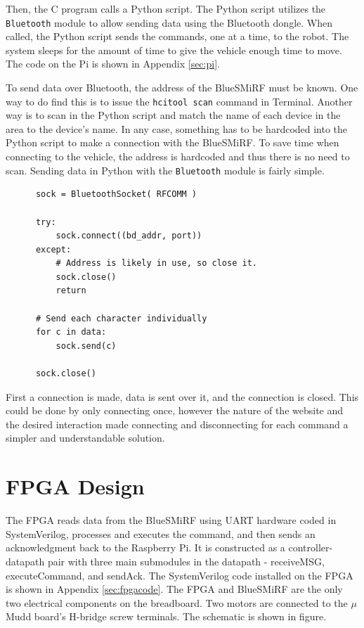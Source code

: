 \documentclass[12pt]{article}
\begin{document}
Then, the C program calls a Python script. The Python script utilizes the \verb.Bluetooth. module to allow sending data using the Bluetooth dongle. When called, the Python script sends the commands, one at a time, to the robot. The system sleeps for the amount of time to give the vehicle enough time to move. The code on the Pi is shown in Appendix \ref{sec:pi}. 

To send data over Bluetooth, the address of the BlueSMiRF must be known. One way to do find this is to issue the \verb.hcitool scan. command in Terminal. Another way is to scan in the Python script and match the name of each device in the area to the device's name. In any case, something has to be hardcoded into the Python script to make a connection with the BlueSMiRF. To save time when connecting to the vehicle, the address is hardcoded and thus there is no need to scan.
\newpage
Sending data in Python with the \verb.Bluetooth. module is fairly simple.

\begin{verbatim}
      sock = BluetoothSocket( RFCOMM )
  
      try:
          sock.connect((bd_addr, port))
      except:
          # Address is likely in use, so close it.
          sock.close()
          return
      
      # Send each character individually
      for c in data:
          sock.send(c)
      
      sock.close()
\end{verbatim}
First a connection is made, data is sent over it, and the connection is closed. This could be done by only connecting once, however the nature of the website and the desired interaction made connecting and disconnecting for each command a simpler and understandable solution.

\section{FPGA Design}

The FPGA reads data from the BlueSMiRF using UART hardware coded in SystemVerilog, processes and executes the command, and then sends an acknowledgment back to the Raspberry Pi.  It is constructed as a controller-datapath pair with three main submodules in the datapath - receiveMSG, executeCommand, and sendAck.  The SystemVerilog code installed on the FPGA is shown in Appendix \ref{sec:fpgacode}. The FPGA and BlueSMiRF are the only two electrical components on the breadboard. Two motors are connected to the $\mu$Mudd board's H-bridge screw terminals.  The schematic is shown in figure.
\end{document}
